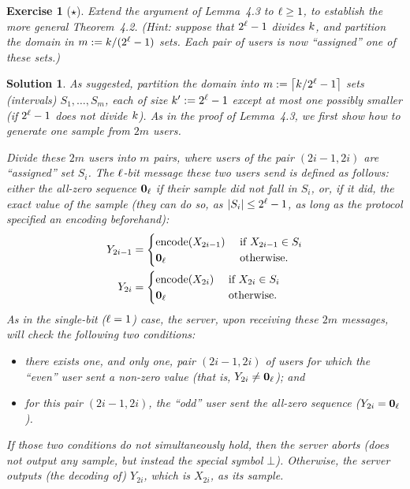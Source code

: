 \documentclass[biber,plain]{nowfnt} %
\newtheorem{question}{Exercise}[chapter]
\newtheorem{solution}{Solution}[chapter]
\begin{document}
\begin{question}[$\star$]\label{exo:simulate:infer}
Extend the argument of Lemma~4.3 to $\ell\geq 1$, to establish the more general Theorem~4.2. \emph{(Hint: suppose that $2^\ell -1$ divides $k$, and partition the domain in $m:= k/(2^\ell -1)$ sets. Each pair of users is now ``assigned'' one of these sets.)}
\end{question}
\begin{solution}
As suggested, partition the domain into $m\eqdef \clg{\ab/2^\numbits -1}$ sets (\eg intervals) $S_1,\dots, S_m$, each of size $k' := 2^\ell -1$ except at most one possibly smaller (if $2^\ell -1$ does not divide $k$). As in the proof of Lemma~4.3, we first show how to generate one sample from $2m$ users.

Divide these $2m$ users into $m$ pairs, where users of the pair $(2i-1, 2i)$ are ``assigned'' set $S_i$. The $\ell$-bit message these two users send is defined as follows: either the all-zero sequence $\textbf{0}_\ell$ if their sample did not fall in $S_i$, or, if it did, the exact value of the sample (they can do so, as $|S_i| \leq 2^\ell -1$, as long as the protocol specified an encoding beforehand):
\begin{align*}
	Y_{2i-1} &= 
		\begin{cases}
			\textrm{encode}(X_{2i-1}) &\text{ if } X_{2i-1} \in S_i\\
			\textbf{0}_\ell &\text{ otherwise.}
		\end{cases} \\
	Y_{2i} &= 
		\begin{cases}
			\textrm{encode}(X_{2i}) &\text{ if } X_{2i} \in S_i\\
			\textbf{0}_\ell &\text{ otherwise.}
		\end{cases}
\end{align*}
As in the single-bit ($\ell=1$) case, the server, upon receiving these $2m$ messages, will check the following
two conditions:
\begin{itemize}
	\item there exists one, and only one, pair $(2i - 1, 2i)$ of users for which the ``even'' user sent a non-zero value (that is, $Y_{2i}\neq  \textbf{0}_\ell$); and
	\item for this pair $(2i - 1, 2i)$, the ``odd'' user sent the all-zero sequence ($Y_{2i}=\textbf{0}_\ell$).
\end{itemize}
If those two conditions do not simultaneously hold, then the server aborts (does not output any sample, but instead the special symbol $\bot$). Otherwise, the server outputs (the decoding of) $Y_{2i}$, which is $X_{2i}$, as its sample.

\end{solution}
\end{document}
